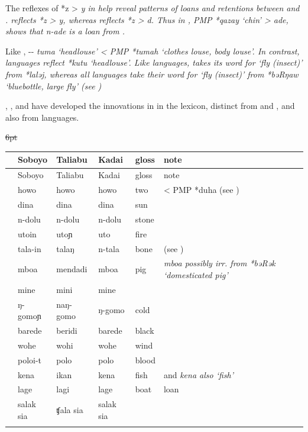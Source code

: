 The reflexes of *z > \it{y} in  help reveal patterns
of loans and retentions between  and .
 reflects *z > \it{y},
whereas  reflects *z > \it{d}.
Thus in , PMP *qazay ‘chin’ >  \it{ade},
shows that  \it{n-ade} is a loan from .

Like , -- \it{tuma} ‘headlouse’ < PMP
*tumah ‘clothes louse, body louse’.
In contrast,  languages reflect *kutu ‘headlouse’.
Like  languages,  takes its word for
‘fly (insect)’ from *laləj,
whereas all  languages take their word for ‘fly
(insect)’ from  *bəRŋaw ‘bluebottle,
large fly’ (see )

, , and  have developed the innovations in 
in the lexicon, distinct from  and ,
and also from  languages.

{\wg\st{6pt}\begin{xltabular}[l]{\linewidth}{>{\hspace{-\tabcolsep}}l<{\hspace{-\tabcolsep}}>{\hspace{-\tabcolsep}\enspace}llllX}
\lsptoprule
{}&	{Soboyo}	&	{Taliabu}	&	{Kadai}	&	{gloss}	&	{note}	\\ \midrule
\endfirsthead
\lsptoprule
					&	{Soboyo}	&	{Taliabu}	&	{Kadai}	&	{gloss}	&	{note}	\\ \midrule
\endhead
&	howo	&	howo	&	howo	&	two	&	< PMP *duha (see )	\\
&	dina	&	dina	&	dina	&	sun	&	\hp{\,}	\\
&	n-dolu	&	n-dolu	&	n-dolu	&	stone	&	\hp{\,}	\\
&	utoin	&	utoɲ	&	uto	&	fire	&	\hp{\,}	\\
&	tala-in	&	talaŋ	&	n-tala	&	bone	&	(see )	\\
&	mboa	&	mendadi	&	mboa	&	pig	&	\it{mboa} possibly irr. from *bəRək `domesticated pig'	\\
&	mine	&	mini	&	mine	&		\\
&	ŋ-gomoɲ	&	naŋ-gomo	&	ŋ-gomo	&	cold	&	\hp{\,}	\\
&	barede	&	beridi	&	barede	&	black	&	\hp{\,}	\\
&	wohe	&	wohi	&	wohe	&	wind	&	\hp{\,}	\\
&	poloi-t	&	polo	&	polo	&	blood	&	\hp{\,}	\\
&	kena	&	ikan	&	kena	&	fish	&	 and  \it{kena} also `fish'	\\
&	lage	&	lagi	&	lage	&	boat	&	 loan	\\
&	salak sia	&	ʧala sia	&	salak sia	&		\\
\lspbottomrule
\end{xltabular}\addtocounter{table}{-1}}

